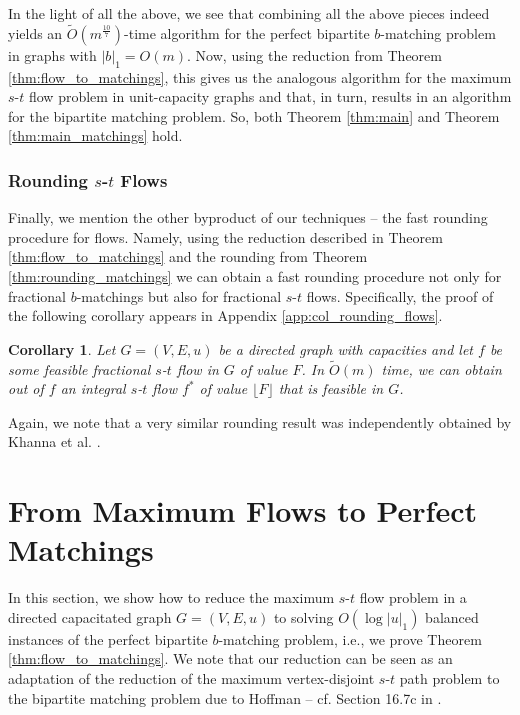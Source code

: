 \documentclass[11pt, letterpaper]{article}
\newtheorem{corollary}[theorem]{Corollary}
\newcommand{\floor}[1]{\lfloor #1 \rfloor}
\newcommand{\onorm}[1]{|#1|_{1}}
\newcommand{\tO}[1]{\widetilde{O}(#1)}
\newcommand{\bb}{\boldsymbol{\mathit{b}}}
\newcommand{\ff}{\boldsymbol{\mathit{f}}}
\newcommand{\uu}{\boldsymbol{\mathit{u}}}
\begin{document}
In the light of all the above, we see that combining all the above pieces indeed yields an $\tO{m^{\frac{10}{7}}}$-time algorithm for the perfect bipartite $\bb$-matching problem in graphs with $\onorm{\bb}=O(m)$. Now, using the reduction from Theorem \ref{thm:flow_to_matchings}, this gives us the analogous algorithm for the maximum $s$-$t$ flow problem in unit-capacity graphs and that, in turn, results in an algorithm for the bipartite matching problem. So, both Theorem \ref{thm:main} and Theorem \ref{thm:main_matchings} hold.

\subsubsection*{Rounding $s$-$t$ Flows}

Finally, we mention the other byproduct of our techniques -- the fast rounding procedure for flows. Namely, using the reduction described in Theorem \ref{thm:flow_to_matchings} and the rounding from Theorem \ref{thm:rounding_matchings} we can obtain a fast rounding procedure not only for fractional $\bb$-matchings but also for fractional $s$-$t$ flows. Specifically, the proof of the following corollary appears in Appendix \ref{app:col_rounding_flows}. 

\begin{corollary}\label{col:rounding_flows}
Let $G=(V,E,\uu)$ be a directed graph with capacities and let $\ff$ be some feasible fractional $s$-$t$ flow in $G$ of value $F$. In $\tO{m}$ time, we can obtain out of $\ff$ an integral $s$-$t$ flow $\ff^*$ of value $\floor{F}$ that is feasible in $G$. 
\end{corollary} 

\noindent Again, we note that a very similar rounding result was independently obtained by Khanna et al. \cite{KhannaKL13}.  \section{From Maximum Flows to Perfect Matchings}\label{sec:reduction}

In this section, we show how to reduce the maximum $s$-$t$ flow problem in a directed capacitated graph $G=(V,E,\uu)$ to solving $O(\log \onorm{\uu})$ balanced instances of the perfect bipartite $\bb$-matching problem, i.e., we prove Theorem \ref{thm:flow_to_matchings}. We note that our reduction can be seen as an adaptation of the reduction of the maximum vertex-disjoint $s$-$t$ path problem to the bipartite matching problem due to Hoffman \cite{Hoffman60} -- cf. Section 16.7c in \cite{Schrijver03}.
\end{document}
